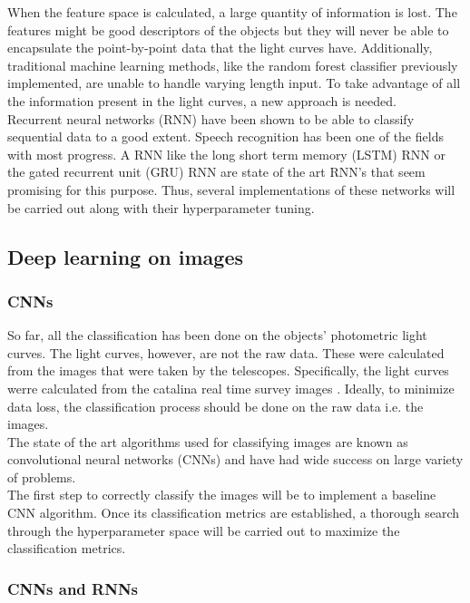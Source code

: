 When the feature space is calculated, a large quantity of information is lost. The features might be good descriptors of the objects but they will never be able to encapsulate the point-by-point data that the light curves have. Additionally, traditional machine learning methods, like the random forest classifier previously implemented, are unable to handle varying length input. To take advantage of all the information present in the light curves, a new approach is needed.\\

Recurrent neural networks (RNN) have been shown to be able to classify sequential data to a good extent. Speech recognition has been one of the fields with most progress\cite{RNN}. A RNN like the long short term memory (LSTM) RNN or the gated recurrent unit (GRU) RNN are state of the art RNN's that seem promising for this purpose. Thus, several implementations of these networks will be carried out along with their hyperparameter tuning. 

\subsection{Deep learning on images}

\subsubsection{CNNs}

So far, all the classification has been done on the objects' photometric light curves. The light curves, however, are not the raw data. These were calculated from the images that were taken by the telescopes. Specifically, the light curves werre calculated from the catalina real time survey images \cite{catalinaImages}. Ideally, to minimize data loss, the classification process should be done on the raw data i.e. the images.\\ 

The state of the art algorithms used for classifying images are known as convolutional neural networks (CNNs) \cite{CNN} and have had wide success on large variety of problems.\\

The first step to correctly classify the images will be to implement a baseline CNN algorithm. Once its classification  metrics are established, a thorough search through the hyperparameter space will be carried out to maximize the classification metrics.

\subsubsection{CNNs and RNNs}\label{NNarchitecture}

